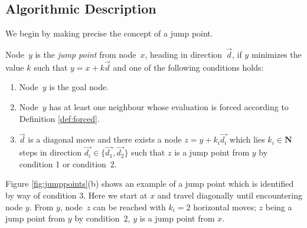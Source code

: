 \subsection{Algorithmic Description}
We begin by making precise the concept of a jump point.  

\begin{definition}
\label{def:jump}
Node~$y$ is the \emph{jump point} from node~$x$, heading in direction~$\vec{d}$,
if $y$ minimizes the value $k$ such that $y = x + k \vec{d}$ and one of the
following conditions holds:
\begin{enumerate}
\item{Node~$y$ is the goal node.}
\item{Node~$y$ has at least one neighbour whose evaluation is forced according 
to Definition \ref{def:forced}.}
\item{$\vec{d}$ is a diagonal move and there exists a node $z = y +
k_i\vec{d_{i}}$ which lies $k_i \in \mathbf{N}$ steps in direction $\vec{d_i} \in
\{\vec{d_1},\vec{d_2}\}$ such that $z$ is a jump point from $y$ by condition 1 or condition~2.}
\end{enumerate}
\end{definition}

Figure \ref{fig:jumppoints}(b) shows an example of a jump point which is
identified by way of condition 3.
Here we start at $x$ and travel diagonally until encountering node $y$. 
From $y$, node~$z$ can be reached with $k_i = 2$ horizontal moves; 
$z$ being a jump point from $y$ by condition~2, 
$y$ is a jump point from $x$.  




